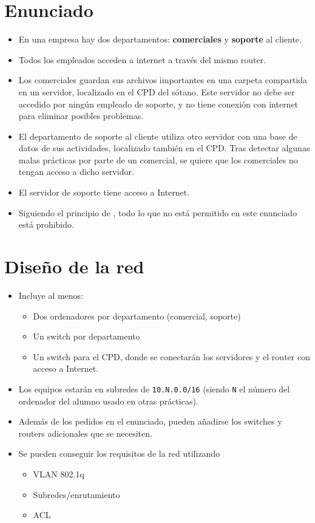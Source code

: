 \section{Enunciado}
\begin{itemize}
\item En una empresa hay dos departamentos: \textbf{comerciales} y \textbf{soporte} al cliente.
\item Todos los empleados acceden a internet a través del mismo router.
\item Los comerciales guardan sus archivos importantes en una carpeta compartida en un servidor, localizado en el CPD del sótano. Este servidor no debe ser accedido por ningún empleado de soporte, y no tiene conexión con internet para eliminar posibles problemas.
\item El departamento de soporte al cliente utiliza otro servidor con una base de datos de sus actividades, localizado también en el CPD. Tras detectar algunas malas prácticas por parte de un comercial, se quiere que los comerciales no tengan acceso a dicho servidor.
\item El servidor de soporte tiene acceso a Internet.  
\item Siguiendo el principio de , todo lo que no está permitido en este enunciado está prohibido.
\end{itemize}

\section{Diseño de la red}
\begin{itemize}
\item Incluye al menos:
  \begin{itemize}
  \item Dos ordenadores por departamento (comercial, soporte)
  \item Un switch por departamento
  \item Un switch para el CPD, donde se conectarán los servidores y el router con acceso a Internet.
  \end{itemize}
\item Los equipos estarán en subredes de \texttt{10.N.0.0/16} (siendo \texttt{N} el número del ordenador del alumno usado en otras prácticas).
\item Además de los pedidos en el enunciado, pueden añadirse los switches y routers adicionales que se necesiten.  
\item Se pueden conseguir los requisitos de la red utilizando
  \begin{itemize}
  \item VLAN 802.1q
  \item Subredes/enrutamiento
  \item ACL 
  \end{itemize}
\end{itemize}



